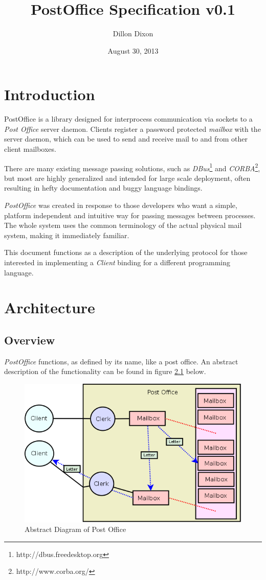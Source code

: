 \documentclass[10pt]{report}
\title{\textbf{PostOffice Specification v0.1}}
\author{Dillon Dixon}
\date{August 30, 2013}
\begin{document}
\maketitle
\tableofcontents

\chapter{Introduction}

PostOffice is a library designed for interprocess communication via sockets to a \emph{Post Office} server daemon. Clients register a password protected \emph{mailbox} with the server daemon, which can be used to send and receive mail to and from other client mailboxes.

There are many existing message passing solutions, such as \emph{DBus}\footnote{http://dbus.freedesktop.org} and \emph{CORBA}\footnote{http://www.corba.org/}, but most are highly generalized and intended for large scale deployment, often resulting in hefty documentation and buggy language bindings.

\emph{PostOffice} was created in response to those developers who want a simple, platform independent and intuitive way for passing messages between processes. The whole system uses the common terminology of the actual physical mail system, making it immediately familiar.

This document functions as a description of the underlying protocol for those interested in implementing a \emph{Client} binding for a different programming language.

\chapter{Architecture}

\section{Overview}

\emph{PostOffice} functions, as defined by its name, like a post office. An abstract description of the functionality can be found in figure \ref{fig:post_office} below.

\begin{figure}[H]
\centering
\includegraphics[scale=0.4]{Diagrams/postoffice_spec.png}
\caption{Abstract Diagram of Post Office}
\label{fig:post_office}
\end{figure}
\end{document}
